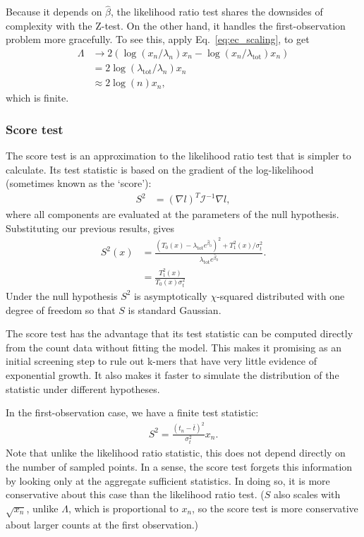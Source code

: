 \documentclass[12pt, letterpaper]{article}
\newcommand{ \lambtot }{\lambda_{\text{tot}}}
\begin{document}
Because it depends on $\hat{\beta}$, the likelihood ratio test shares the downsides of complexity with the Z-test.
On the other hand, it handles the first-observation problem more gracefully.
To see this, apply Eq.~\ref{eq:ec_scaling}, to get
\begin{align}
    \Lambda & \to 2 \left( \log(x_n / \lambda_n) x_n - \log(x_n / \lambtot) x_n \right) \\
            & = 2 \log(\lambtot / \lambda_n) x_n \\
            & \approx 2 \log(n) x_n,
\end{align}
which is finite.

\subsubsection{Score test}

The score test is an approximation to the likelihood ratio test that is simpler to calculate.
Its test statistic is based on the gradient of the log-likelihood (sometimes known as the `score'):
\begin{align}
    S^2 & = {(\nabla l)}^T \mathcal{I}^{-1} \nabla l,
\end{align}
where all components are evaluated at the parameters of the null hypothesis.
Substituting our previous results, gives
\begin{align}
    S^2(x) & = \frac{{(T_0(x) - \lambtot e^{\hat{\beta}_0})}^2 + T_1^2(x) / \sigma_t^2}{\lambtot e^{\hat{\beta}_0}}. \\
           & = \frac{T_1^2(x)}{T_0(x) \sigma_t^2}
           \label{eq:score}
\end{align}
Under the null hypothesis $S^2$ is asymptotically $\chi$-squared distributed with one degree of freedom so that $S$ is standard Gaussian.

The score test has the advantage that its test statistic can be computed directly from the count data without fitting the model.
This makes it promising as an initial screening step to rule out k-mers that have very little evidence of exponential growth.
It also makes it faster to simulate the distribution of the statistic under different hypotheses.

In the first-observation case, we have a finite test statistic:
\begin{align}
    S^2 = \frac{{(t_n - \bar{t})}^2}{\sigma_t^2} x_n.
\end{align}
Note that unlike the likelihood ratio statistic, this does not depend directly on the number of sampled points.
In a sense, the score test forgets this information by looking only at the aggregate sufficient statistics.
In doing so, it is more conservative about this case than the likelihood ratio test.
($S$ also scales with $\sqrt{x_n}$, unlike $\Lambda$, which is proportional to $x_n$, so the score test is more conservative about larger counts at the first observation.)
\end{document}
